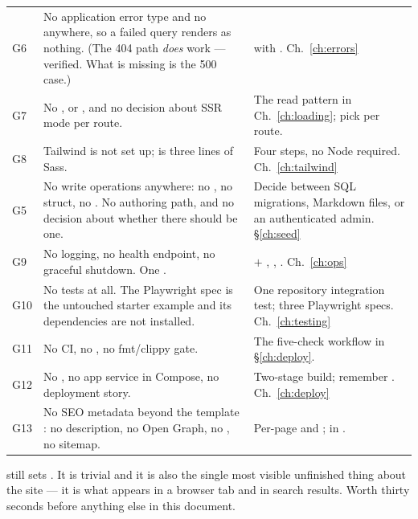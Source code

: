 \begin{longtable}{@{}p{}L{0.40\textwidth}L{0.49\textwidth}@{}}
G6 & No application error type and no  anywhere, so a failed query renders as
nothing. (The 404 path \emph{does} work --- verified. What is missing is the 500 case.) &
 with . Ch.~\ref{ch:errors} \\

G7 & No ,  or , and no decision about SSR mode per
route. & The read pattern in Ch.~\ref{ch:loading}; pick  per route. \\

G8 & Tailwind is not set up;  is three lines of Sass. & Four steps, no Node
required. Ch.~\ref{ch:tailwind} \\

G5 & No write operations anywhere: no , no  struct, no
. No authoring path, and no decision about whether there should be one. & Decide
between SQL migrations, Markdown files, or an authenticated admin. \S\ref{ch:seed} \\

G9 & No logging, no health endpoint, no graceful shutdown. One . &
 $+$ , , .
Ch.~\ref{ch:ops} \\

G10 & No tests at all. The Playwright spec is the untouched starter example and its dependencies
are not installed. & One repository integration test; three Playwright specs.
Ch.~\ref{ch:testing} \\

G11 & No CI, no , no fmt/clippy gate. & The five-check workflow in
\S\ref{ch:deploy}. \\

G12 & No , no app service in Compose, no deployment story. & Two-stage build;
remember . Ch.~\ref{ch:deploy} \\

G13 & No SEO metadata beyond the template : no description,
no Open Graph, no , no sitemap. & Per-page  and ;
 in . \\

\end{longtable}
\endgroup

\begin{pitfall}
 still sets . It is trivial and it is also
the single most visible unfinished thing about the site --- it is what appears in a browser tab and
in search results. Worth thirty seconds before anything else in this document.
\end{pitfall}

